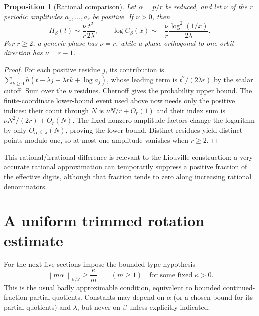 \documentclass[11pt,a4paper]{article}
\newtheorem{proposition}[theorem]{Proposition}
\theoremstyle{definition}
\theoremstyle{remark}\newtheorem{remark}[theorem]{Remark}
\newcommand{\T}{\mathbb R/\mathbb Z}
\newcommand{\dn}[1]{\left\|#1\right\|_{\T}}
\begin{document}
\begin{proposition}[Rational comparison]
\label{prop:rationalleading}
Let $\alpha=p/r$ be reduced, and let $\nu$ of the $r$ periodic amplitudes
$a_1,\ldots,a_r$ be positive.  If $\nu>0$, then
\[
 H_\beta(t)\sim\frac{\nu}{r}\frac{t^2}{2\lambda},\qquad
 \log C_\beta(x)\sim-\frac{\nu}{r}\frac{\log^2(1/x)}{2\lambda}.
\]
For $r\ge2$, a generic phase has $\nu=r$, while a phase orthogonal to one
orbit direction has $\nu=r-1$.
\end{proposition}
\begin{proof}
For each positive residue $j$, its contribution is
$\sum_{k\ge0}h(t-\lambda j-\lambda rk+\log a_j)$, whose leading term is
$t^2/(2\lambda r)$ by the scalar cutoff.  Sum over the $\nu$ residues.
Chernoff gives the probability upper bound.  The finite-coordinate lower-bound
event used above now needs only the positive indices: their count through
$N$ is $\nu N/r+O_r(1)$ and their index sum is
$\nu N^2/(2r)+O_r(N)$.  The fixed nonzero amplitude factors change the
logarithm by only $O_{\alpha,\beta,\lambda}(N)$, proving the lower bound.
Distinct residues yield distinct points modulo one, so at most one amplitude
vanishes when $r\ge2$.
\end{proof}

This rational/irrational difference is relevant to the Liouville construction:
a very accurate rational approximation can temporarily suppress a positive
fraction of the effective digits, although that fraction tends to zero along
increasing rational denominators.

\section{A uniform trimmed rotation estimate}
\label{sec:rotation}

For the next five sections impose the bounded-type hypothesis
\begin{equation}
 \dn{m\alpha}\ge\frac{\kappa}{m}\qquad(m\ge1)
 \quad\text{for some fixed }\kappa>0.
 \tag{BT}\label{eq:BT}
\end{equation}
This is the usual badly approximable condition, equivalent to bounded
continued-fraction partial quotients.  Constants may depend on $\alpha$
(or a chosen bound for its partial quotients) and $\lambda$, but never on
$\beta$ unless explicitly indicated.
\end{document}
